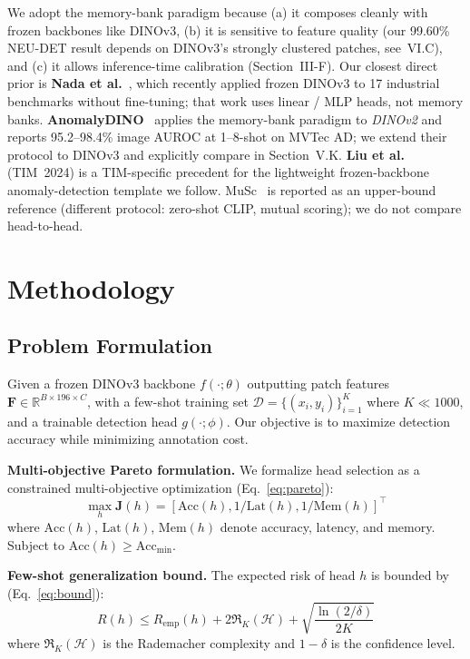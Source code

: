 \documentclass[journal]{IEEEtran}
\begin{document}
We adopt the memory-bank paradigm because (a) it composes cleanly with frozen backbones like DINOv3, (b) it is sensitive to feature quality (our 99.60\% NEU-DET result depends on DINOv3's strongly clustered patches, see~VI.C), and (c) it allows inference-time calibration (Section~III-F). Our closest direct prior is \textbf{Nada et al.}~\cite{ref49}, which recently applied frozen DINOv3 to 17 industrial benchmarks without fine-tuning; that work uses linear / MLP heads, not memory banks. \textbf{AnomalyDINO}~\cite{ref46} applies the memory-bank paradigm to \emph{DINOv2} and reports 95.2--98.4\% image AUROC at 1--8-shot on MVTec AD; we extend their protocol to DINOv3 and explicitly compare in Section~V.K. \textbf{Liu et al.}~\cite{ref50} (TIM~2024) is a TIM-specific precedent for the lightweight frozen-backbone anomaly-detection template we follow. MuSc~\cite{ref44} is reported as an upper-bound reference (different protocol: zero-shot CLIP, mutual scoring); we do not compare head-to-head.

\section{Methodology}

\subsection{Problem Formulation}
Given a frozen DINOv3 backbone $f(\cdot; \theta)$ outputting patch features $\mathbf{F} \in \mathbb{R}^{B \times 196 \times C}$, with a few-shot training set $\mathcal{D} = \{(x_i, y_i)\}_{i=1}^{K}$ where $K \ll 1000$, and a trainable detection head $g(\cdot; \phi)$. Our objective is to maximize detection accuracy while minimizing annotation cost.

\textbf{Multi-objective Pareto formulation.} We formalize head selection as a constrained multi-objective optimization (Eq.~\ref{eq:pareto}):
\begin{equation}
\max_{h} \mathbf{J}(h) = [\mathrm{Acc}(h), 1/\mathrm{Lat}(h), 1/\mathrm{Mem}(h)]^\top
\label{eq:pareto}
\end{equation}
where $\mathrm{Acc}(h)$, $\mathrm{Lat}(h)$, $\mathrm{Mem}(h)$ denote accuracy, latency, and memory. Subject to $\mathrm{Acc}(h) \geq \mathrm{Acc}_{\min}$.

\textbf{Few-shot generalization bound.} The expected risk of head $h$ is bounded by (Eq.~\ref{eq:bound}):
\begin{equation}
R(h) \leq R_{\mathrm{emp}}(h) + 2 \mathfrak{R}_K(\mathcal{H}) + \sqrt{\frac{\ln(2/\delta)}{2K}}
\label{eq:bound}
\end{equation}
where $\mathfrak{R}_K(\mathcal{H})$ is the Rademacher complexity and $1-\delta$ is the confidence level.
\end{document}
